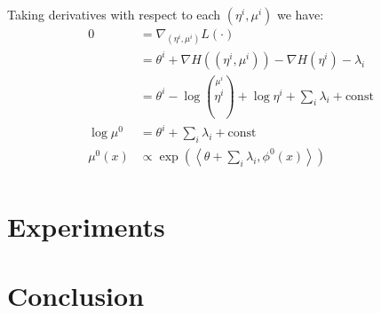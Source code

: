 \documentclass[times, 10pt,twocolumn]{article}
\begin{document}
Taking derivatives with respect to each $(\eta^i,\mu^i)$ we have:
\begin{equation}
  \begin{split}
    0 &= \nabla_{(\eta^i,\mu^i)} L(\cdot) \\
    &= \theta^i + \nabla H\left((\eta^i,\mu^i)\right) - \nabla
    H(\eta^i) - \lambda_i \\
    &= \theta^i  - \log \left (\stackrel{\mu^i}{\eta^i}\right) +
    \log \eta^i  +  \sum_i
    \lambda_i + \mathrm{const} \\
    \log \mu^0 &= \theta^i  + \sum_i \lambda_i + \mathrm{const} \\
    \mu^0(x) &\propto \exp(\left \langle \theta  + \sum_i \lambda_i,
    \phi^0(x) \right\rangle)\\
   \end{split}
 \end{equation}

\section{Experiments}

\section{Conclusion}


\nocite{ex1,ex2}


\end{document}
